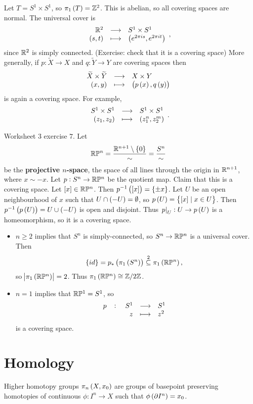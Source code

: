 \pagebreak

\begin{example*}
Let $ T = S^1 \times S^1 $, so $ \pi_1\br{T} = \Z^2 $. This is abelian, so all covering spaces are normal. The universal cover is
$$ \function{\R^2}{S^1 \times S^1}{\br{s, t}}{\br{e^{2\pi is}, e^{2\pi it}}}, $$
since $ \mathbb{R}^2 $ is simply connected. (Exercise: check that it is a covering space) More generally, if $ p : \widetilde{X} \to X $ and $ q : \widetilde{Y} \to Y $ are covering spaces then
$$ \function{\widetilde{X} \times \widetilde{Y}}{X \times Y}{\br{x, y}}{\br{p\br{x}, q\br{y}}} $$
is again a covering space. For example,
$$ \function{S^1 \times S^1}{S^1 \times S^1}{\br{z_1, z_2}}{\br{z_1^n, z_2^m}}. $$
\end{example*}

\begin{example*}
Worksheet $ 3 $ exercise $ 7 $. Let
$$ \R\P^n = \dfrac{\R^{n + 1} \setminus \cbr{0}}{\sim} = \dfrac{S^n}{\sim} $$
be the \textbf{projective $ n $-space}, the space of all lines through the origin in $ \mathbb{R}^{n + 1} $, where $ x \sim -x $. Let $ p : S^n \to \mathbb{R}\mathbb{P}^n $ be the quotient map. Claim that this is a covering space. Let $ \sbr{x} \in \R\P^n $. Then $ p^{-1}\br{\sbr{x}} = \cbr{\pm x} $. Let $ U $ be an open neighbourhood of $ x $ such that $ U \cap \br{-U} = \emptyset $, so $ p\br{U} = \cbr{\sbr{x} \mid x \in U} $. Then $ p^{-1}\br{p\br{U}} = U \cup \br{-U} $ is open and disjoint. Thus $ \eval{p}_U : U \to p\br{U} $ is a homeomorphism, so it is a covering space.
\begin{itemize}
\item $ n \ge 2 $ implies that $ S^n $ is simply-connected, so $ S^n \to \mathbb{R}\mathbb{P}^n $ is a universal cover. Then
$$ \cbr{id} = p_*\br{\pi_1\br{S^n}} \overset{2}{\subseteq} \pi_1\br{\R\P^n}, $$
so $ \abs{\pi_1\br{\R\P^n}} = 2 $. Thus $ \pi_1\br{\R\P^n} \cong \Z / 2\Z $.
\item $ n = 1 $ implies that $ \mathbb{R}\mathbb{P}^1 = S^1 $, so
$$ \function[p]{S^1}{S^1}{z}{z^2} $$
is a covering space.
\end{itemize}
\end{example*}

\pagebreak

\section{Homology}


Higher homotopy groups $ \pi_n\br{X, x_0} $ are groups of basepoint preserving homotopies of continuous $ \phi : I^n \to X $ such that $ \phi\br{\partial I^n} = x_0 $.

